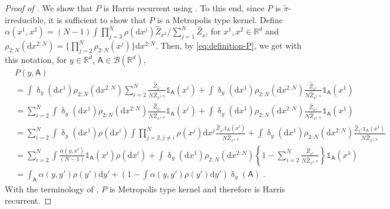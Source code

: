 \documentclass{article}
\def\rmd{\operatorname{d}\hspace{-2pt}}
\def\rset{\mathbb{R}}
\def\rmd{\mathrm{d}}
\def\eqsp{\,}
\def\msa{\mathsf{A}}
\def\eqsp{\;}
\newcommand{\1}{\mathds{1}}
\newcommand{\indi}[1]{\1_{#1}}
\def\proposal{\rho}
\newcommand{\chunku}[3]{#1^{#2:#3}}
\newcommand{\estConstC}[1]{\widehat{Z}_{#1}}
\def\tpi{\tilde{\pi}}
\def\msa{\mathsf{A}}
\def\mcbb{\mathcal{B}}  %
\newcommand{\mcb}[1]{\mathcal{B}(#1)}
\def\rset{\mathbb{R}}
\def\rmd{\mathrm{d}}
\begin{document}
\begin{proof}[Proof of ]
  We show that $P$ is Harris recurrent using \citep[Corollary
  2]{tierney:1994}. To this end, since $P$ is $\tpi$-irreducible, it
  is sufficient to show that $P$ is a Metropolis type kernel.
  Define
  $\alpha(x^1, x^2) = (N-1) \int \prod_{j=3}^N \proposal(\rmd x^j)
  \estConstC{x^2}/\sum_{j=1}^N\estConstC{x^j}$ for
  $x^1,x^2 \in \rset^d$ and
  $\rho_{2:N}(\rmd \chunku{x}{2}{N}) =\{ \prod_{j=2}^N
  \rho_{2:N}(x^j)\} \rmd \chunku{x}{2}{N}$.  Then, by
  \eqref{eq:definition-P}, we get with this notation, for
  $y \in \rset^d$, $\msa \in\mcbb(\rset^d)$,
\begin{align}
    \nonumber
  &P(y, \msa) \\
    \nonumber
  &=  \int \updelta_{y}(\rmd x^1) \rho_{2:N}(\rmd \chunku{x}{2}{N}) \sum_{i=2}^N\frac{\estConstC{x^i}}{N\estConstC{\chunku{x}{1}{N}}}\indi{\msa}(x^i) + \int\updelta_{y}(\rmd x^1) \rho_{2:N}(\rmd \chunku{x}{2}{N})\frac{\estConstC{x^1}}{N\estConstC{\chunku{x}{1}{N}}}\indi{\msa}(x^1)
  \\
    \nonumber
  &=  \sum_{i=2}^N\int \updelta_{y}(\rmd x^1) \rho_{2:N}(\rmd \chunku{x}{2}{N})\frac{\estConstC{x^i}}{N\estConstC{\chunku{x}{1}{N}}}\indi{\msa}(x^i) + \int\updelta_{y}(\rmd x^1) \rho_{2:N}(\rmd \chunku{x}{2}{N})\frac{\estConstC{x^1}}{N\estConstC{\chunku{x}{1}{N}}}\indi{\msa}(x^1)\\
    \nonumber
  &=\sum_{i=2}^N \int \updelta_y(\rmd x^1)\proposal(\rmd x^i) \int \prod_{j=2, j\neq i}^N \proposal(x^j) \rmd x^j  \frac{\estConstC{x^i}\indi{\msa}(x^i)}{N\estConstC{\chunku{x}{1}{N}}} +\int\updelta_{y}(\rmd x^1) \rho_{2:N}(\rmd \chunku{x}{2}{N})\frac{\estConstC{x^1}\indi{\msa}(x^1)}{N\estConstC{\chunku{x}{1}{N}}}\\
  \nonumber
  &= \sum_{i=2}^N \int\frac{\alpha(y, x^i)}{(N-1)} \indi{\msa}(x^i)\proposal(\rmd x^i) +  \int\updelta_{y}(\rmd x^1) \rho_{2:N}(\rmd \chunku{x}{2}{N}) \left\{1- \sum_{i= 2} ^N \frac{\estConstC{x^i}}{N\estConstC{\chunku{x}{1}{N}}}\right\}\indi{\msa}(x^1) \\
  \label{eq:metropolis_type}
&=\int_\msa \alpha(y, y')\proposal(y')\rmd y' +  \left(1- \int\alpha(y,y')\proposal(y')\rmd y'\right) \updelta_y(\msa)\eqsp.
\end{align}
With the terminology of \citep[Corollary 2]{tierney:1994}, $P$ is
Metropolis type kernel and therefore is Harris recurrent.



\end{proof}
\end{document}

